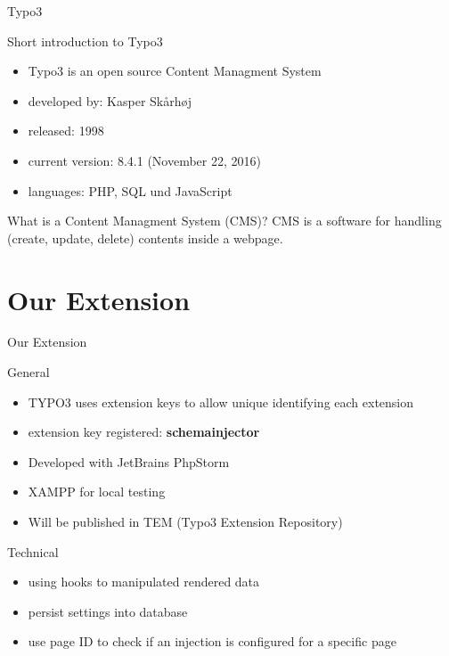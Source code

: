 \documentclass{beamer}
\begin{document}
\begin{frame}{Typo3}
\begin{block}{Short introduction to Typo3}
\begin{itemize}
\item Typo3 is an open source Content Managment System
\item developed by: Kasper Skårhøj
\item released: 1998
\item current version: 8.4.1 (November 22, 2016)
\item languages: PHP, SQL und JavaScript
\end{itemize}
\end{block}
\begin{block}{What is a Content Managment System (CMS)?}
CMS is a software for handling (create, update, delete) contents inside a webpage.
\end{block}

\end{frame}

\section{Our Extension}

\begin{frame}{Our Extension}

\begin{block}{General}
\begin{itemize}
\item TYPO3 uses extension keys to allow unique identifying each extension
\item extension key registered:  \textbf{schema\textunderscore injector}
\item Developed with JetBrains PhpStorm
\item XAMPP for local testing
\item Will be published in TEM (Typo3 Extension Repository)
\end{itemize}
\end{block}

\begin{block}{Technical}
\begin{itemize}
\item using hooks to manipulated rendered data
\item persist settings into database
\item use page ID to check if an injection is configured for a specific page
\end{itemize}
\end{block}
\end{frame}
\end{document}
